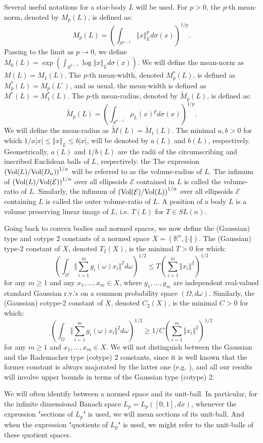 \documentclass[12pt,oneside]{amsart}
\theoremstyle{definition}
\theoremstyle{remark}
\theoremstyle{proof}
\numberwithin{equation}{section}
\newcommand{\norm}[1]{\left\Vert#1\right\Vert}
\newcommand{\snorm}[1]{\Vert#1\Vert}
\newcommand{\abs}[1]{\left\vert#1\right\vert}
\newcommand{\brac}[1]{\left(#1\right)}
\newcommand{\Real}{\mathbb{R}}
\newcommand{\E}{\mathcal{E}}
\renewcommand{\MR}{\widetilde{M}} %
\newcommand{\Vol}[1]{\textnormal{Vol} (#1)}
\newcommand{\sVolRatio}[2]{\brac{\Vol{#1}/\Vol{#2}}^{1/n}}
\begin{document}
\smallskip
Several useful notations for a star-body $L$ will be used. For
$p>0$, the $p$-th mean-norm, denoted by $M_p(L)$, is defined as:
\[
M_p(L) = \brac{\int_{ S^{n-1} } \norm{x}^p_L d\sigma(x)}^{1/p}.
\]
Passing to the limit as $p \rightarrow 0$, we define $M_0(L) =
\exp\brac{\int_{ S^{n-1} } \log \norm{x}_L d\sigma(x)}$. We will
define the mean-norm as $M(L) = M_1(L)$. The $p$-th mean-width,
denoted $M^*_p(L)$, is defined as $M^*_p(L) = M_p(L^\circ)$, and
as usual, the mean-width is defined as $M^*(L) = M^*_1(L)$. The
$p$-th mean-radius, denoted by $\MR_p(L)$, is defined as:
\[
\MR_p(L) = \brac{\int_{ S^{n-1} } \rho_L(x)^p d\sigma(x)}^{1/p}.
\]
We will define the mean-radius as $\MR(L) = \MR_1(L)$. The
minimal $a,b>0$ for which $1/a \abs{x} \leq \norm{x}_L \leq b
\abs{x}$, will be denoted by $a(L)$ and $b(L)$, respectively.
Geometrically, $a(L)$ and $1/b(L)$ are the radii of the
circumscribing and inscribed Euclidean balls of $L$, respectively.
the The expression $\sVolRatio{L}{D_n}$ will be referred to as the
volume-radius of $L$. The infimum of $\sVolRatio{L}{\E}$ over all
ellipsoids $\E$ contained in $L$ is called the volume-ratio of
$L$. Similarly, the infimum of $\sVolRatio{\E}{L}$ over all
ellipsoids $\E$ containing $L$ is called the outer volume-ratio
of $L$. A position of a body $L$ is a volume preserving linear
image of $L$, i.e. $T(L)$ for $T \in SL(n)$.

Going back to convex bodies and normed spaces, we now define the
(Gaussian) type and cotype 2 constants of a normed space
$X=(\Real^n,\norm{\cdot})$. The (Gaussian) type-2 constant of $X$,
denoted $T_2(X)$, is the minimal $T>0$ for which:
\[
\brac{\int_\Omega \snorm{\sum_{i=1}^m g_i(\omega) x_i}^2
d\omega}^{1/2} \leq T \brac{\sum_{i=1}^m \norm{x_i}^2}^{1/2}
\]
for any $m \geq 1$ and any $x_1,\ldots,x_m \in X$, where
$g_1,\ldots,g_m$ are independent real-valued standard Gaussian
r.v.'s on a common probability space $(\Omega,d\omega)$.
Similarly, the (Gaussian) cotype-2 constant of $X$, denoted
$C_2(X)$, is the minimal $C>0$ for which:
\[
\brac{\int_\Omega \snorm{\sum_{i=1}^m g_i(\omega) x_i}^2
d\omega}^{1/2} \geq 1/C \brac{\sum_{i=1}^m \norm{x_i}^2}^{1/2}
\]
for any $m \geq 1$ and $x_1,\ldots,x_m \in X$. We will not
distinguish between the Gaussian and the Rademacher type (cotype)
2 constants, since it is well known that the former constant is
always majorated by the latter one (e.g.
\cite{Milman-Schechtman-Book}), and all our results will involve
upper bounds in terms of the Gaussian type (cotype) 2.

We will often identify between a normed space and its unit-ball.
In particular, for the infinite dimensional Banach space $L_p =
L_p([0,1],dx)$, whenever the expression "sections of $L_p$" is
used, we will mean sections of its unit-ball. And when the
expression "quotients of $L_p$" is used, we might refer to the
unit-balls of these quotient spaces.
\end{document}
